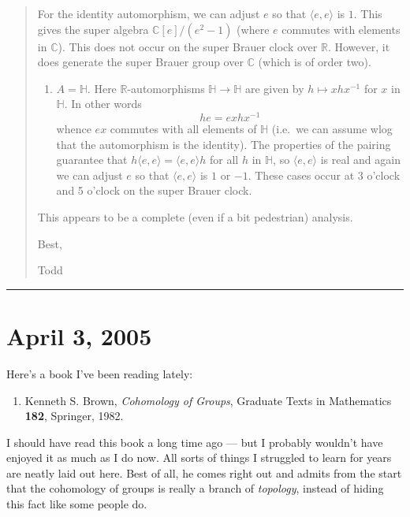 \documentclass{article}
\def\tightlist{}
\begin{document}
\begin{quote}
For the identity automorphism, we can adjust \(e\) so that
\(\langle e, e\rangle\) is \(1\). This gives the super algebra
\(\mathbb{C}[e]/(e^2 - 1)\) (where \(e\) commutes with elements in
\(\mathbb{C}\)). This does not occur on the super Brauer clock over
\(\mathbb{R}\). However, it does generate the super Brauer group over
\(\mathbb{C}\) (which is of order two).

\begin{enumerate}
\def\labelenumi{\arabic{enumi}.}
\setcounter{enumi}{2}
\tightlist
\item
  \(A = \mathbb{H}\). Here \(\mathbb{R}\)-automorphisms \(\mathbb{H}
  \to \mathbb{H}\) are given by \(h \mapsto xhx^{-1}\) for \(x\) in
  \(\mathbb{H}\). In other words \[he = exhx^{-1}\] whence \(ex\)
  commutes with all elements of \(\mathbb{H}\) (i.e.~we can assume wlog
  that the automorphism is the identity). The properties of the pairing
  guarantee that \(h\langle e, e\rangle = \langle e, e\rangle h\) for
  all \(h\) in \(\mathbb{H}\), so \(\langle e, e\rangle\) is real and
  again we can adjust \(e\) so that \(\langle e, e\rangle\) is \(1\) or
  \(-1\). These cases occur at 3 o'clock and 5 o'clock on the super
  Brauer clock.
\end{enumerate}

This appears to be a complete (even if a bit pedestrian) analysis.

Best,

Todd
\end{quote}

\begin{center}\rule{0.5\linewidth}{0.5pt}\end{center}



\hypertarget{week213}{%
\section{April 3, 2005}\label{week213}}

Here's a book I've been reading lately:

\begin{enumerate}
\def\labelenumi{\arabic{enumi})}
\tightlist
\item
  Kenneth S. Brown, \emph{Cohomology of Groups}, Graduate Texts in
  Mathematics \textbf{182}, Springer, 1982.
\end{enumerate}

I should have read this book a long time ago --- but I probably wouldn't
have enjoyed it as much as I do now. All sorts of things I struggled to
learn for years are neatly laid out here. Best of all, he comes right
out and admits from the start that the cohomology of groups is really a
branch of \emph{topology}, instead of hiding this fact like some people
do.
\end{document}
